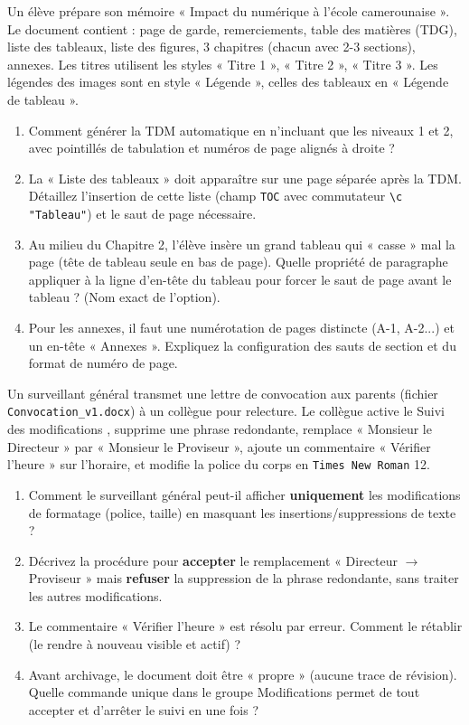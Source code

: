 \documentclass[11pt]{article}
\begin{document}
\begin{exercice}
Un élève prépare son mémoire « Impact du numérique à l'école camerounaise ». Le document contient : page de garde, remerciements, table des matières (TDG), liste des tableaux, liste des figures, 3 chapitres (chacun avec 2-3 sections), annexes. Les titres utilisent les styles « Titre 1 », « Titre 2 », « Titre 3 ». Les légendes des images sont en style « Légende », celles des tableaux en « Légende de tableau ».
\begin{enumerate}
    \item Comment générer la TDM automatique en n'incluant que les niveaux 1 et 2, avec pointillés de tabulation et numéros de page alignés à droite ?
    \item La « Liste des tableaux » doit apparaître sur une page séparée après la TDM. Détaillez l'insertion de cette liste (champ \texttt{TOC} avec commutateur \texttt{\textbackslash c "Tableau"}) et le saut de page nécessaire.
    \item Au milieu du Chapitre 2, l'élève insère un grand tableau qui « casse » mal la page (tête de tableau seule en bas de page). Quelle propriété de paragraphe appliquer à la ligne d'en-tête du tableau pour forcer le saut de page avant le tableau ? (Nom exact de l'option).
    \item Pour les annexes, il faut une numérotation de pages distincte (A-1, A-2...) et un en-tête « Annexes ». Expliquez la configuration des sauts de section et du format de numéro de page.
\end{enumerate}
\end{exercice}

\begin{exercice}
Un surveillant général transmet une lettre de convocation aux parents (fichier \texttt{Convocation\_v1.docx}) à un collègue pour relecture. Le collègue active le \og Suivi des modifications \fg, supprime une phrase redondante, remplace « Monsieur le Directeur » par « Monsieur le Proviseur », ajoute un commentaire « Vérifier l'heure » sur l'horaire, et modifie la police du corps en \texttt{Times New Roman} 12.
\begin{enumerate}
    \item Comment le surveillant général peut-il afficher \textbf{uniquement} les modifications de formatage (police, taille) en masquant les insertions/suppressions de texte ?
    \item Décrivez la procédure pour \textbf{accepter} le remplacement « Directeur $\to$ Proviseur » mais \textbf{refuser} la suppression de la phrase redondante, sans traiter les autres modifications.
    \item Le commentaire « Vérifier l'heure » est résolu par erreur. Comment le rétablir (le rendre à nouveau visible et actif) ?
    \item Avant archivage, le document doit être « propre » (aucune trace de révision). Quelle commande unique dans le groupe \og Modifications \fg permet de tout accepter et d'arrêter le suivi en une fois ?
\end{enumerate}
\end{exercice}
\end{document}
